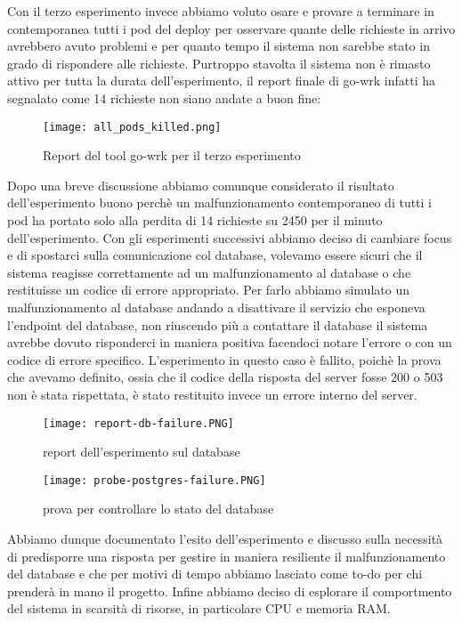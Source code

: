 Con il terzo esperimento invece abbiamo voluto osare e provare a terminare in contemporanea tutti i pod del deploy per osservare quante delle richieste in arrivo avrebbero avuto problemi e per quanto tempo il sistema non sarebbe stato in grado di rispondere alle richieste.
Purtroppo stavolta il sistema non è rimasto attivo per tutta la durata dell'esperimento, il report finale di go-wrk infatti ha segnalato come 14 richieste non siano andate a buon fine:
\begin{figure}[h]
    \centering
    \texttt{[image: all\_pods\_killed.png]}
    \caption{Report del tool go-wrk per il terzo esperimento}
    \label{tab:report-all-pods-killed}
\end{figure}
Dopo una breve discussione abbiamo comunque considerato il risultato dell'esperimento buono perchè un malfunzionamento contemporaneo di tutti i pod ha portato solo alla perdita di 14 richieste su 2450 per il minuto dell'esperimento.
Con gli esperimenti successivi abbiamo deciso di cambiare focus e di spostarci sulla comunicazione col database, volevamo essere sicuri che il sistema reagisse correttamente ad un malfunzionamento al database o che restituisse un codice di errore appropriato.
Per farlo abbiamo simulato un malfunzionamento al database andando a disattivare il servizio che esponeva l'endpoint del database, non riuscendo più a contattare il database il sistema avrebbe dovuto risponderci in maniera positiva facendoci notare l'errore o con un codice di errore specifico.
L'esperimento in questo caso è fallito, poichè la prova che avevamo definito, ossia che il codice della risposta del server fosse 200 o 503 non è stata rispettata, è stato restituito invece un errore interno del server.
\begin{figure}[h]
    \centering
    \texttt{[image: report-db-failure.PNG]}
    \caption{report dell'esperimento sul database}
    \label{tab:report-database-experiment}
\end{figure}
\begin{figure}[h]
    \centering
    \texttt{[image: probe-postgres-failure.PNG]}
    \caption{prova per controllare lo stato del database}
    \label{tab:report-database-experiment}
\end{figure}
Abbiamo dunque documentato l'esito dell'esperimento e discusso sulla necessità di predisporre una risposta per gestire in maniera resiliente il malfunzionamento del database e che per motivi di tempo abbiamo lasciato come to-do per chi prenderà in mano il progetto.
Infine abbiamo deciso di esplorare il comportmento del sistema in scarsità di risorse, in particolare CPU e memoria RAM.

